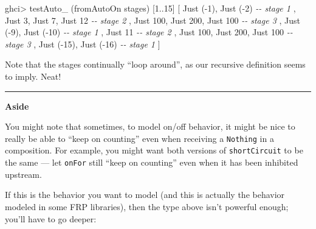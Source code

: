 \documentclass[]{article}
\newenvironment{Shaded}{}{}
\newcommand{\CommentTok}[1]{\textcolor[rgb]{0.38,0.63,0.69}{\textit{#1}}}
\newcommand{\DataTypeTok}[1]{\textcolor[rgb]{0.56,0.13,0.00}{#1}}
\newcommand{\DecValTok}[1]{\textcolor[rgb]{0.25,0.63,0.44}{#1}}
\newcommand{\NormalTok}[1]{#1}
\newcommand{\OperatorTok}[1]{\textcolor[rgb]{0.40,0.40,0.40}{#1}}
\begin{document}
\begin{Shaded}
\begin{Highlighting}[]
\NormalTok{ghci}\OperatorTok{\textgreater{}}\NormalTok{ testAuto\_ (fromAutoOn stages) [}\DecValTok{1}\OperatorTok{..}\DecValTok{15}\NormalTok{]}
\NormalTok{[ }\DataTypeTok{Just}\NormalTok{ (}\OperatorTok{{-}}\DecValTok{1}\NormalTok{), }\DataTypeTok{Just}\NormalTok{ (}\OperatorTok{{-}}\DecValTok{2}\NormalTok{)              }\CommentTok{{-}{-} stage 1}
\NormalTok{, }\DataTypeTok{Just} \DecValTok{3}\NormalTok{, }\DataTypeTok{Just} \DecValTok{7}\NormalTok{, }\DataTypeTok{Just} \DecValTok{12}           \CommentTok{{-}{-} stage 2}
\NormalTok{, }\DataTypeTok{Just} \DecValTok{100}\NormalTok{, }\DataTypeTok{Just} \DecValTok{200}\NormalTok{, }\DataTypeTok{Just} \DecValTok{100}      \CommentTok{{-}{-} stage 3}
\NormalTok{, }\DataTypeTok{Just}\NormalTok{ (}\OperatorTok{{-}}\DecValTok{9}\NormalTok{), }\DataTypeTok{Just}\NormalTok{ (}\OperatorTok{{-}}\DecValTok{10}\NormalTok{)             }\CommentTok{{-}{-} stage 1}
\NormalTok{, }\DataTypeTok{Just} \DecValTok{11}                           \CommentTok{{-}{-} stage 2}
\NormalTok{, }\DataTypeTok{Just} \DecValTok{100}\NormalTok{, }\DataTypeTok{Just} \DecValTok{200}\NormalTok{, }\DataTypeTok{Just} \DecValTok{100}      \CommentTok{{-}{-} stage 3}
\NormalTok{, }\DataTypeTok{Just}\NormalTok{ (}\OperatorTok{{-}}\DecValTok{15}\NormalTok{), }\DataTypeTok{Just}\NormalTok{ (}\OperatorTok{{-}}\DecValTok{16}\NormalTok{)            }\CommentTok{{-}{-} stage 1}
\NormalTok{]}
\end{Highlighting}
\end{Shaded}

Note that the stages continually ``loop around'', as our recursive definition
seems to imply. Neat!

\begin{center}\rule{0.5\linewidth}{0.5pt}\end{center}

\textbf{Aside}

You might note that sometimes, to model on/off behavior, it might be nice to
really be able to ``keep on counting'' even when receiving a \texttt{Nothing} in
a composition. For example, you might want both versions of
\texttt{shortCircuit} to be the same --- let \texttt{onFor} still ``keep on
counting'' even when it has been inhibited upstream.

If this is the behavior you want to model (and this is actually the behavior
modeled in some FRP libraries), then the type above isn't powerful enough;
you'll have to go deeper:
\end{document}
